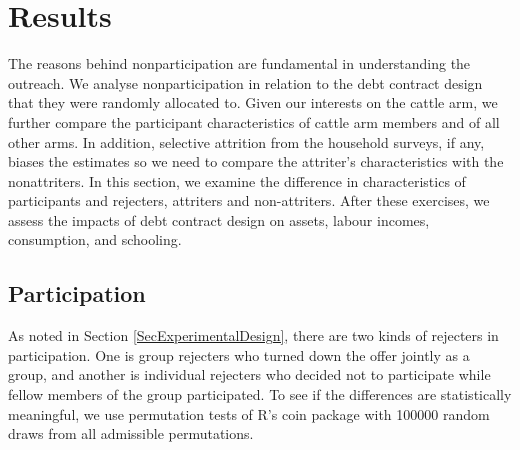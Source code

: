 \section{Results}
\label{SecResults}








	The reasons behind nonparticipation are fundamental in understanding the outreach. We analyse nonparticipation in relation to the debt contract design that they were randomly allocated to. Given our interests on the \textsf{cattle} arm, we further compare the participant characteristics of \textsf{cattle} arm members and of all other arms. In addition, selective attrition from the household surveys, if any, biases the estimates so we need to compare the attriter's characteristics with the nonattriters. In this section, we examine the difference in characteristics of participants and rejecters, attriters and non-attriters. After these exercises, we assess the impacts of debt contract design on assets, labour incomes, consumption, and schooling. 


\subsection{Participation}
\label{ResultsSectionParticipation}


	As noted in Section \ref{SecExperimentalDesign}, there are two kinds of rejecters in participation. One is group rejecters who turned down the offer jointly as a group, and another is individual rejecters who decided not to participate while fellow members of the group participated. To see if the differences are statistically meaningful, we use permutation tests of \textsf{R}'s \textsf{coin} package with 100000 random draws from all admissible permutations. 

